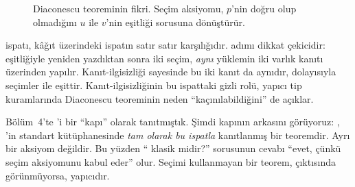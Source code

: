 \begin{figure}[htbp]
\centering
{}
\caption{Diaconescu teoreminin fikri. Seçim aksiyomu, $p$'nin doğru olup
olmadığını $u$ ile $v$'nin eşitliği sorusuna dönüştürür.}
\label{fig:diaconescu}
\end{figure}


\noindent \Lean{} ispatı, kâğıt üzerindeki ispatın satır satır karşılığıdır.
 adımı dikkat çekicidir:  eşitliğiyle yeniden yazdıktan
sonra iki seçim, \emph{aynı} yüklemin iki varlık kanıtı üzerinden yapılır.
Kanıt-ilgisizliği sayesinde bu iki kanıt da aynıdır, dolayısıyla seçimler
 ile eşittir. Kanıt-ilgisizliğinin bu ispattaki gizli rolü,
yapıcı tip kuramlarında Diaconescu teoreminin neden ``kaçınılabildiğini''
de açıklar.

\begin{onemlifikir}
Bölüm~4'te 'i bir ``kapı'' olarak tanıtmıştık. Şimdi
kapının arkasını görüyoruz: , \Lean{}'in standart
kütüphanesinde \emph{tam olarak bu ispatla} kanıtlanmış bir teoremdir. Ayrı
bir aksiyom değildir. Bu yüzden ``\Lean{} klasik midir?'' sorusunun cevabı
``evet, çünkü seçim aksiyomunu kabul eder'' olur. Seçimi kullanmayan bir
teorem,   çıktısında 
görünmüyorsa, yapıcıdır.
\end{onemlifikir}

